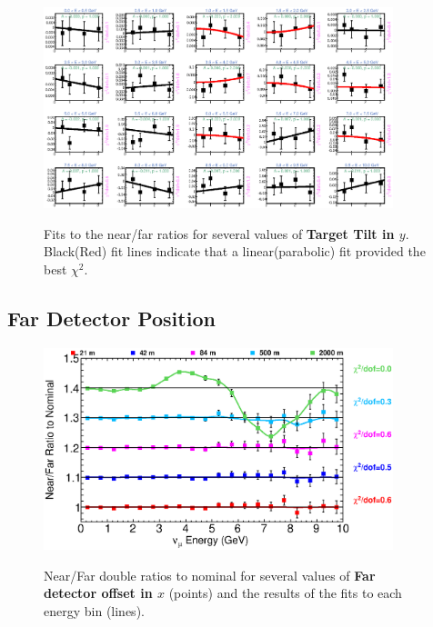 \begin{figure}[hb]
  \begin{center}
    {\includegraphics[width=4.0in]{figures/TargetYTilt_nof_fits.eps}}
  \end{center}
\caption{ Fits to the near/far ratios for several values of {\bf Target Tilt in $y$}. Black(Red) fit lines indicate that a linear(parabolic) fit provided the best $\chi^2$. }
\end{figure}

\clearpage
\subsection{Far Detector Position}

\begin{figure}[ht]
  \begin{center}
    {\includegraphics[width=4.0in]{figures/LBNEFDX_nof_summary.eps}}
  \end{center}
\caption{ Near/Far double ratios to nominal for several values of {\bf Far detector offset in $x$} (points) and the results of the fits to each energy bin (lines).}
\end{figure}

